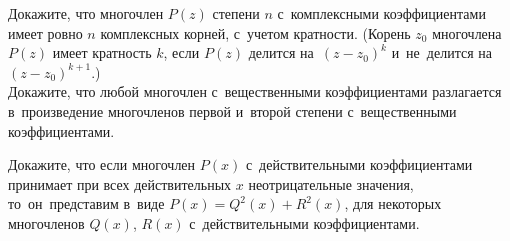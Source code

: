 \begin{problems}
\item
\sbp
Докажите, что многочлен $P(z)$ степени $n$ с~комплексными коэффициентами имеет
ровно $n$ комплексных корней, с~учетом кратности.
(Корень $z_0$ многочлена $P(z)$ имеет кратность $k$, если $P(z)$ делится
на~$(z - z_0)^k$ и~не~делится на~$(z - z_0)^{k+1}$.)
\\
\sbp
Докажите, что любой многочлен с~вещественными коэффициентами разлагается
в~произведение многочленов первой и~второй степени с~вещественными
коэффициентами.

\item
Докажите, что если многочлен $P(x)$ с~действительными коэффициентами принимает
при всех действительных $x$ неотрицательные значения, то~он~представим в~виде
$P(x) = Q^2(x) + R^2(x)$, для некоторых многочленов $Q(x)$, $R(x)$
с~действительными коэффициентами.

\end{problems}

